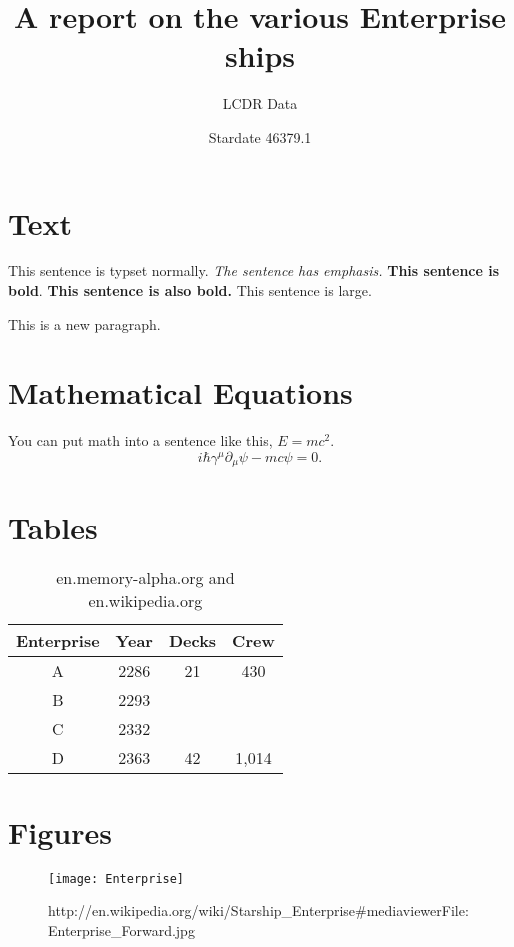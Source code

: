 \documentclass{article}
\title{A report on the various Enterprise ships}
\author{LCDR Data}
\date{Stardate 46379.1}
\begin{document}
\maketitle
\tableofcontents
\newpage

\section{Text}
This sentence is typset normally. \emph{The sentence has emphasis.} {\bf This sentence is bold}. \textbf{This sentence is also bold.} {\Large This sentence is large.}

This is a new paragraph.

\section{Mathematical Equations}
You can put math into a sentence like this, $E=mc^2$.
\begin{equation}
i\hbar\gamma^{\mu}\partial_{\mu}\psi-mc\psi=0.
\end{equation}

\section{Tables}
\begin{table}[h]
\center
\caption{en.memory-alpha.org and en.wikipedia.org}
\begin{tabular}{c|ccc}
\hline
\hline
Enterprise & Year & Decks & Crew \\
\hline
A & 2286 & 21 & 430\\
B & 2293 & & \\
C & 2332 & & \\
D & 2363 & 42 & 1,014\\
\hline
\hline
\end{tabular}
\end{table}

\section{Figures}
\begin{figure}[h]
\center
\texttt{[image: Enterprise]} %
\caption{http://en.wikipedia.org/wiki/Starship\_Enterprise\#mediaviewer\/File:Enterprise\_Forward.jpg}
\end{figure}
\end{document}
